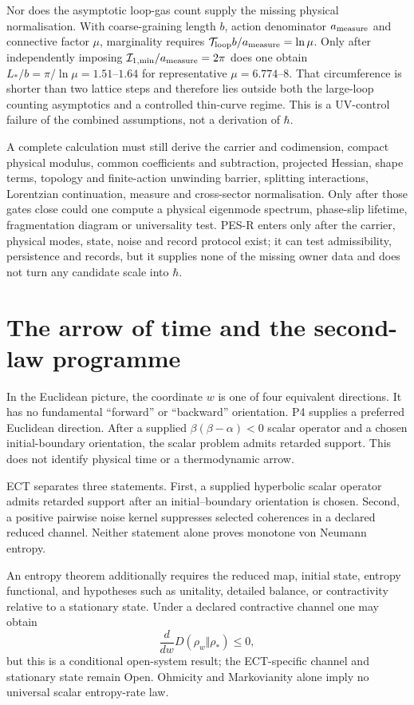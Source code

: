 \documentclass[11pt,a4paper]{article}
\begin{document}
Nor does the asymptotic loop-gas count supply the missing physical
normalisation.  With coarse-graining length $b$, action denominator
$a_{\rm measure}$ and connective factor $\mu$, marginality requires
$\mathcal T_{\rm loop}b/a_{\rm measure}=\ln\mu$.  Only after independently
imposing $\mathcal I_{1,\min}/a_{\rm measure}=2\pi$ does one obtain
$L_*/b=\pi/\ln\mu=1.51$--$1.64$ for representative
$\mu=6.774$--$8$.  That circumference is shorter than two lattice steps and
therefore lies outside both the large-loop counting asymptotics and a
controlled thin-curve regime.  This is a UV-control failure of the combined
assumptions, not a derivation of $\hbar$.

A complete calculation must still derive the carrier and codimension,
compact physical modulus, common coefficients and subtraction, projected
Hessian, shape terms, topology and finite-action unwinding barrier,
splitting interactions, Lorentzian continuation, measure and cross-sector
normalisation.  Only after those gates close could one compute a physical
eigenmode spectrum, phase-slip lifetime, fragmentation diagram or
universality test.  PES-R enters only after the carrier, physical modes,
state, noise and record protocol exist; it can test admissibility,
persistence and records, but it supplies none of the missing owner data and
does not turn any candidate scale into $\hbar$.



\section{The arrow of time and the second-law programme}
\label{sec:pop_arrow}

In the Euclidean picture, the coordinate $w$ is one of four equivalent
directions.  It has no fundamental ``forward'' or ``backward'' orientation.
P4 supplies a preferred Euclidean direction.  After a supplied
$\beta(\beta-\alpha)<0$ scalar operator and a chosen initial-boundary orientation,
the scalar problem admits retarded support.  This does not identify physical
time or a thermodynamic arrow.

ECT separates three statements.  First, a supplied hyperbolic scalar operator
admits retarded support after an initial--boundary orientation is chosen.
Second, a positive pairwise noise kernel suppresses selected coherences in a
declared reduced channel.  Neither statement alone proves monotone von
Neumann entropy.

An entropy theorem additionally requires the reduced map, initial state,
entropy functional, and hypotheses such as unitality, detailed balance, or
contractivity relative to a stationary state.  Under a declared contractive
channel one may obtain
\begin{equation}
  \frac{d}{dw}D(\rho_w\Vert\rho_*)\le0,
  \label{eq:pop_2ndlaw}
\end{equation}
but this is a conditional open-system result; the ECT-specific channel and
stationary state remain Open.  Ohmicity and Markovianity alone imply no
universal scalar entropy-rate law.
\end{document}
